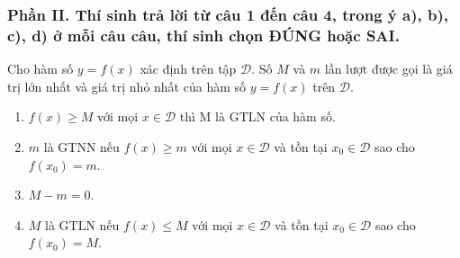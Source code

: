 \subsubsection*{Phần II. Thí sinh trả lời từ câu 1 đến câu 4, trong ý a), b), c), d) ở mỗi câu câu, thí sinh chọn ĐÚNG hoặc SAI.}
\setcounter{bt}{0}
\begin{baitap}
	Cho hàm số $y=f(x)$ xác định trên tập $\mathscr{D}$. Số $M$ và $m$ lần lượt được gọi là giá trị lớn nhất và giá trị nhỏ nhất của hàm số $y=f(x)$ trên $\mathscr{D}$.
	\begin{enumerate}[\quad \bf a)]
		\item $f(x) \ge M$ với mọi $x \in \mathscr{D}$ thì M là GTLN của hàm số.
		\item $m$ là GTNN nếu $f(x) \ge m$ với mọi $x \in \mathscr{D}$ và tồn tại $x_0 \in \mathscr{D}$ sao cho $f(x_0) = m$.
		\item $M - m = 0$.
		\item $M$ là GTLN nếu $f(x) \le M$ với mọi $x \in \mathscr{D}$ và tồn tại $x_0 \in \mathscr{D}$ sao cho $f(x_0) = M$.
	\end{enumerate}
\end{baitap}
